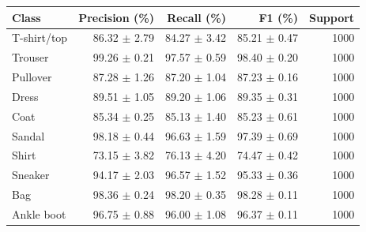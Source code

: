 \begin{tabular}{lrrrr}
\toprule
Class & Precision (\%) & Recall (\%) & F1 (\%) & Support \\
\midrule
T-shirt/top & 86.32 $\pm$ 2.79 & 84.27 $\pm$ 3.42 & 85.21 $\pm$ 0.47 & 1000 \\
Trouser & 99.26 $\pm$ 0.21 & 97.57 $\pm$ 0.59 & 98.40 $\pm$ 0.20 & 1000 \\
Pullover & 87.28 $\pm$ 1.26 & 87.20 $\pm$ 1.04 & 87.23 $\pm$ 0.16 & 1000 \\
Dress & 89.51 $\pm$ 1.05 & 89.20 $\pm$ 1.06 & 89.35 $\pm$ 0.31 & 1000 \\
Coat & 85.34 $\pm$ 0.25 & 85.13 $\pm$ 1.40 & 85.23 $\pm$ 0.61 & 1000 \\
Sandal & 98.18 $\pm$ 0.44 & 96.63 $\pm$ 1.59 & 97.39 $\pm$ 0.69 & 1000 \\
Shirt & 73.15 $\pm$ 3.82 & 76.13 $\pm$ 4.20 & 74.47 $\pm$ 0.42 & 1000 \\
Sneaker & 94.17 $\pm$ 2.03 & 96.57 $\pm$ 1.52 & 95.33 $\pm$ 0.36 & 1000 \\
Bag & 98.36 $\pm$ 0.24 & 98.20 $\pm$ 0.35 & 98.28 $\pm$ 0.11 & 1000 \\
Ankle boot & 96.75 $\pm$ 0.88 & 96.00 $\pm$ 1.08 & 96.37 $\pm$ 0.11 & 1000 \\
\bottomrule
\end{tabular}

